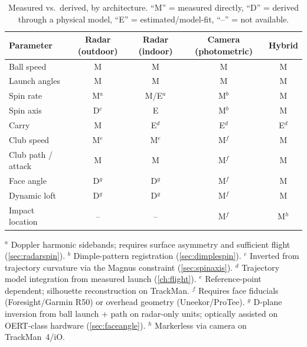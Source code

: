 \begin{table}[htbp]
\centering\small
\caption{Measured vs.\ derived, by architecture. ``M'' = measured directly,
``D'' = derived through a physical model, ``E'' = estimated/model-fit,
``--'' = not available.}
\label{tab:hierarchy}
\begin{tabular}{@{}lcccc@{}}
\toprule
\textbf{Parameter} & \textbf{Radar (outdoor)} & \textbf{Radar (indoor)} &
\textbf{Camera (photometric)} & \textbf{Hybrid} \\
\midrule
Ball speed          & M & M & M & M \\
Launch angles       & M & M & M & M \\
Spin rate           & M$^{a}$ & M/E$^{a}$ & M$^{b}$ & M \\
Spin axis           & D$^{c}$ & E & M$^{b}$ & M \\
Carry               & M & E$^{d}$ & E$^{d}$ & E$^{d}$ \\
Club speed          & M$^{e}$ & M$^{e}$ & M$^{f}$ & M \\
Club path / attack  & M & M & M$^{f}$ & M \\
Face angle          & D$^{g}$ & D$^{g}$ & M$^{f}$ & M \\
Dynamic loft        & D$^{g}$ & D$^{g}$ & M$^{f}$ & M \\
Impact location     & -- & -- & M$^{f}$ & M$^{h}$ \\
\bottomrule
\end{tabular}

\smallskip
\raggedright\footnotesize
$^{a}$ Doppler harmonic sidebands; requires surface asymmetry and
sufficient flight (\cref{sec:radarspin}).
$^{b}$ Dimple-pattern registration (\cref{sec:dimplespin}).
$^{c}$ Inverted from trajectory curvature via the Magnus constraint
(\cref{sec:spinaxis}).
$^{d}$ Trajectory model integration from measured launch
(\cref{ch:flight}).
$^{e}$ Reference-point dependent; silhouette reconstruction on TrackMan.
$^{f}$ Requires face fiducials (Foresight/Garmin R50) or overhead
geometry (Uneekor/ProTee).
$^{g}$ D-plane inversion from ball launch + path on radar-only units;
optically assisted on OERT-class hardware (\cref{sec:faceangle}).
$^{h}$ Markerless via camera on TrackMan~4/iO.
\end{table}
